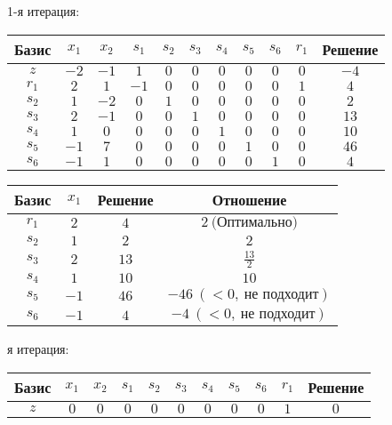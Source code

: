 \documentclass{article}%
\begin{document}
\begin{flushleft}%
1{-}я итерация: %
\newline%
\newline%
\renewcommand{\arraystretch}{1.3}%
\begin{tabular}{|c|ccccccccc|c|}%
\hline%
Базис&$x_{1}$&$x_{2}$&$s_{1}$&$s_{2}$&$s_{3}$&$s_{4}$&$s_{5}$&$s_{6}$&$r_{1}$&Решение\\%
\hline%
$z$&$-2$&$-1$&$1$&$0$&$0$&$0$&$0$&$0$&$0$&$-4$\\%
\hline%
$r_{1}$&$2$&$1$&$-1$&$0$&$0$&$0$&$0$&$0$&$1$&$4$\\%
$s_{2}$&$1$&$-2$&$0$&$1$&$0$&$0$&$0$&$0$&$0$&$2$\\%
$s_{3}$&$2$&$-1$&$0$&$0$&$1$&$0$&$0$&$0$&$0$&$13$\\%
$s_{4}$&$1$&$0$&$0$&$0$&$0$&$1$&$0$&$0$&$0$&$10$\\%
$s_{5}$&$-1$&$7$&$0$&$0$&$0$&$0$&$1$&$0$&$0$&$46$\\%
$s_{6}$&$-1$&$1$&$0$&$0$&$0$&$0$&$0$&$1$&$0$&$4$\\%
\hline%
\end{tabular}%
\newline%
\newline%
\newline%
\begin{tabular}{|cccc|}%
\hline%
Базис&$x_{1}$&Решение&Отношение\\%
\hline%
$r_{1}$&$2$&$4$&$2\: \text{(Оптимально)}$\\%
$s_{2}$&$1$&$2$&$2$\\%
$s_{3}$&$2$&$13$&$\frac{13}{2}$\\%
$s_{4}$&$1$&$10$&$10$\\%
$s_{5}$&$-1$&$46$&$-46\: (< 0, \: \text{не подходит})$\\%
$s_{6}$&$-1$&$4$&$-4\: (< 0, \: \text{не подходит})$\\%
\hline%
\end{tabular}%
\newline%
\newline%
я итерация: %
\newline%
\newline%
\renewcommand{\arraystretch}{1.3}%
\begin{tabular}{|c|ccccccccc|c|}%
\hline%
Базис&$x_{1}$&$x_{2}$&$s_{1}$&$s_{2}$&$s_{3}$&$s_{4}$&$s_{5}$&$s_{6}$&$r_{1}$&Решение\\%
\hline%
$z$&$0$&$0$&$0$&$0$&$0$&$0$&$0$&$0$&$1$&$0$\\%

\end{tabular}
\end{flushleft}
\end{document}
